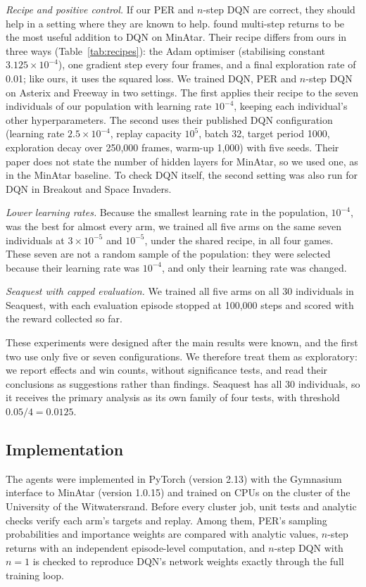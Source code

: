 \documentclass[conference,a4paper]{IEEEtran}
\begin{document}
\emph{Recipe and positive control.} If our PER and $n$-step DQN are correct, they should help in a setting where they are
known to help. \citet{obandoceron2021revisiting} found multi-step returns to be the most useful addition to DQN on
MinAtar. Their recipe differs from ours in three ways (Table~\ref{tab:recipes}): the Adam optimiser
\citep{kingma2015adam} (stabilising constant $3.125\times10^{-4}$), one gradient step every four frames, and a final
exploration rate of 0.01; like ours, it uses the squared loss. We
trained DQN, PER and $n$-step DQN on Asterix and Freeway in two settings. The first applies their recipe to the seven
individuals of our population with learning rate $10^{-4}$, keeping each individual's other hyperparameters. The second
uses their published DQN configuration (learning rate $2.5\times10^{-4}$, replay capacity $10^5$, batch 32, target
period 1000, exploration decay over 250,000 frames, warm-up 1,000) with five seeds. Their paper does not state the
number of hidden layers for MinAtar, so we used one, as in the MinAtar baseline. To check DQN itself, the second
setting was also run for DQN in Breakout and Space Invaders.

\emph{Lower learning rates.} Because the smallest learning rate in the population, $10^{-4}$, was the best for almost every
arm, we trained all five arms on the same seven individuals at $3\times10^{-5}$ and $10^{-5}$, under the shared recipe,
in all four games. These seven are not a random sample of the population: they were selected because their learning
rate was $10^{-4}$, and only their learning rate was changed.

\emph{Seaquest with capped evaluation.} We trained all five arms on all 30 individuals in Seaquest, with each
evaluation episode stopped at 100,000 steps and scored with the reward collected so far.

These experiments were designed after the main results were known, and the first two use only five or seven
configurations. We therefore treat them as exploratory: we report effects and win counts, without significance tests,
and read their conclusions as suggestions rather than findings.
Seaquest has all 30 individuals, so it receives the primary analysis as its own family of four tests, with threshold
$0.05/4=0.0125$.

\subsection{Implementation}\label{sec:implementation}
The agents were implemented in PyTorch \citep{paszke2019pytorch} (version 2.13) with the
Gymnasium \citep{towers2024gymnasium} interface to MinAtar (version 1.0.15) and trained on CPUs on the cluster of the
University of the Witwatersrand. Before every cluster job, unit tests and analytic checks verify each arm's targets and
replay. Among them, PER's sampling probabilities and importance weights are compared with analytic values, $n$-step
returns with an independent episode-level computation, and $n$-step DQN with $n=1$ is checked to reproduce DQN's network
weights exactly through the full training loop.
\end{document}
